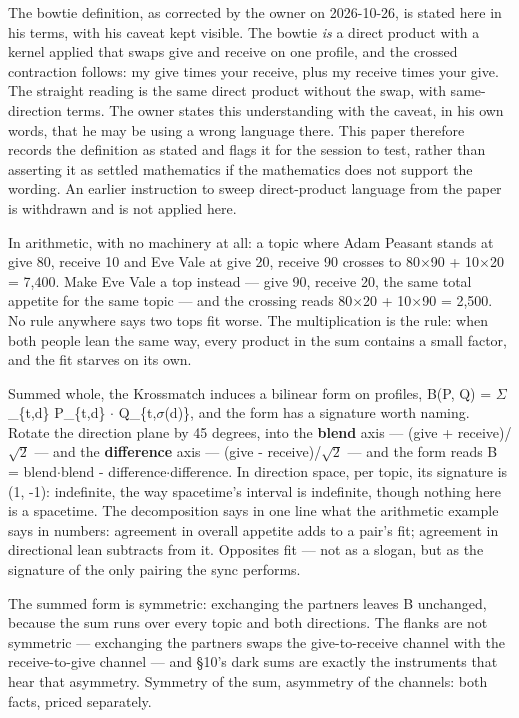 The bowtie definition, as corrected by the owner on 2026-10-26, is
stated here in his terms, with his caveat kept visible. The bowtie
\emph{is} a direct product with a kernel applied that swaps give and
receive on one profile, and the crossed contraction follows: my give
times your receive, plus my receive times your give. The straight
reading is the same direct product without the swap, with same-direction
terms. The owner states this understanding with the caveat, in his own
words, that he may be using a wrong language there. This paper therefore
records the definition as stated and flags it for the session to test,
rather than asserting it as settled mathematics if the mathematics does
not support the wording. An earlier instruction to sweep direct-product
language from the paper is withdrawn and is not applied here.

In arithmetic, with no machinery at all: a topic where Adam Peasant
stands at give 80, receive 10 and Eve Vale at give 20, receive 90
crosses to 80$\times$90 + 10$\times$20 = 7,400. Make Eve Vale a top instead --- give
90, receive 20, the same total appetite for the same topic --- and the
crossing reads 80$\times$20 + 10$\times$90 = 2,500. No rule anywhere says two tops fit
worse. The multiplication is the rule: when both people lean the same
way, every product in the sum contains a small factor, and the fit
starves on its own.

Summed whole, the Krossmatch induces a bilinear form on profiles, B(P,
Q) = $\Sigma$\_\{t,d\} P\_\{t,d\} $\cdot$ Q\_\{t,$\sigma$(d)\}, and the form has a signature
worth naming. Rotate the direction plane by 45 degrees, into the
\textbf{blend} axis --- (give + receive)/$\sqrt{2}$ --- and the
\textbf{difference} axis --- (give - receive)/$\sqrt{2}$ --- and the form reads
B = blend$\cdot$blend - difference$\cdot$difference. In direction space, per topic,
its signature is (1, -1): indefinite, the way spacetime's interval is
indefinite, though nothing here is a spacetime. The decomposition says
in one line what the arithmetic example says in numbers: agreement in
overall appetite adds to a pair's fit; agreement in directional lean
subtracts from it. Opposites fit --- not as a slogan, but as the
signature of the only pairing the sync performs.

The summed form is symmetric: exchanging the partners leaves B
unchanged, because the sum runs over every topic and both directions.
The flanks are not symmetric --- exchanging the partners swaps the
give-to-receive channel with the receive-to-give channel --- and \S 10's
dark sums are exactly the instruments that hear that asymmetry. Symmetry
of the sum, asymmetry of the channels: both facts, priced separately.

